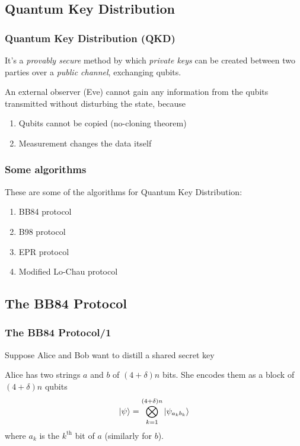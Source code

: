 \documentclass{beamer}
\begin{document}
  \subsection{Quantum Key Distribution}
  \begin{frame}
    \frametitle{Quantum Key Distribution (QKD)}
    It's a \textit{provably secure} method by which \textit{private keys} can be created
    between two parties over a \textit{public channel}, exchanging qubits.

    An external observer (Eve) cannot gain any information from the qubits
    transmitted without disturbing the state, because
    \begin{enumerate}
      \item Qubits cannot be copied (no-cloning theorem)
      \item Measurement changes the data itself
    \end{enumerate}
  \end{frame}
  \begin{frame}
    \frametitle{Some algorithms}
    These are some of the algorithms for Quantum Key Distribution:
    \begin{enumerate}
      \item BB84 protocol
      \item B98 protocol
      \item EPR protocol
      \item Modified Lo-Chau protocol
    \end{enumerate}  
  \end{frame}

  \subsection{The BB84 Protocol}
  \begin{frame}
    \frametitle{The BB84 Protocol/1}
    Suppose Alice and Bob want to distill a shared secret key
    
    Alice has two strings $a$ and $b$ of $(4+\delta)n$ bits.
    She encodes them as a block of $(4+\delta)n$ qubits
    \begin{equation*}
      \ket{\psi} = \bigotimes_{k=1}^{(4+\delta)n} \ket{\psi_{a_kb_k}}
    \end{equation*}
    where $a_k$ is the $k^\text{th}$ bit of $a$ (similarly for $b$).
  \end{frame}
\end{document}
